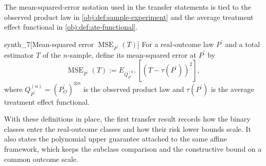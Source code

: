 The mean-squared-error notation used in the transfer statements is tied to the observed product law in \cref{obj:def:sample-experiment} and the average treatment effect functional in \cref{obj:def:ate-functional}.

\begin{definitionv}{synth_7}[Mean-squared error \(\operatorname{MSE}_{P^{\prime}}(T)\)]
For a real-outcome law \(P^{\prime}\) and a total estimator \(T\) of the \(n\)-sample, define its mean-squared error at \(P^{\prime}\) by \[\operatorname{MSE}_{P^{\prime}}(T):=E_{Q_{P^{\prime}}^{(n)}}\left[\left(T-\tau(P^{\prime})\right)^2\right],\] where \(Q_{P^{\prime}}^{(n)}=(P_O^{\prime})^{\otimes n}\) is the observed product law and \(\tau(P^{\prime})\) is the average treatment effect functional.
\end{definitionv}

With these definitions in place, the first transfer result records how the binary classes enter the real-outcome classes and how their risk lower bounds scale. It also states the polynomial upper guarantee attached to the same affine framework, which keeps the subclass comparison and the constructive bound on a common outcome scale.

